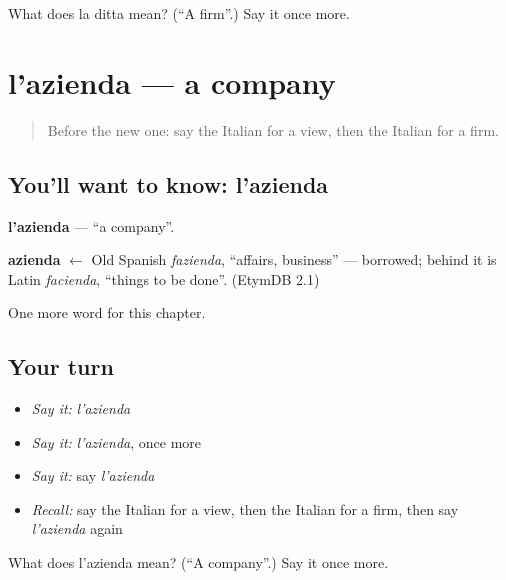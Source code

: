 \begin{tcolorbox}[breakable,colback=teal!4,colframe=teal!35!black,title={Before you move on}]
What does la ditta mean? (\textquotedblleft{}A firm\textquotedblright{}.) Say it once more.
\end{tcolorbox}
\section[l'azienda]{l'azienda — a company}

\label{lesson:IT-C172-azienda}



\begin{quote}
Before the new one: say the Italian for a view, then the Italian for a firm.
\end{quote}

\subsection*{You'll want to know: l'azienda}
\textbf{l'azienda} — \textquotedblleft{}a company\textquotedblright{}.

\begin{cousinweb}
\textbf{azienda} $\leftarrow$ Old Spanish \emph{fazienda}, \textquotedblleft{}affairs, business\textquotedblright{} — borrowed; behind it is Latin \emph{facienda}, \textquotedblleft{}things to be done\textquotedblright{}. (EtymDB 2.1)
\end{cousinweb}

\begin{grammarlens}[title={What you've built}]
One more word for this chapter.
\end{grammarlens}

\subsection*{Your turn}
\begin{itemize}
\raggedright
  \item \emph{Say it:} \emph{l'azienda}
  \item \emph{Say it:} \emph{l'azienda}, once more
  \item \emph{Say it:} say \emph{l'azienda}
  \item \emph{Recall:} say the Italian for a view, then the Italian for a firm, then say \emph{l'azienda} again
\end{itemize}

\begin{tcolorbox}[breakable,colback=teal!4,colframe=teal!35!black,title={Before you move on}]
What does l'azienda mean? (\textquotedblleft{}A company\textquotedblright{}.) Say it once more.
\end{tcolorbox}
